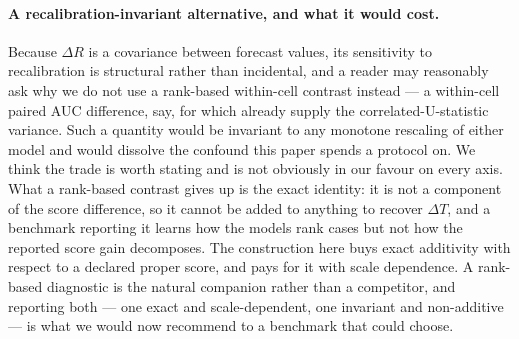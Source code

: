 \paragraph{A recalibration-invariant alternative, and what it would cost.}
Because $\Delta R$ is a covariance between forecast values, its sensitivity to
recalibration is structural rather than incidental, and a reader may reasonably ask why we
do not use a rank-based within-cell contrast instead --- a within-cell paired AUC
difference, say, for which \citet{delong1988comparing} already supply the
correlated-U-statistic variance. Such a quantity would be invariant to any monotone
rescaling of either model and would dissolve the confound this paper spends a protocol on.
We think the trade is worth stating and is not obviously in our favour on every axis.
What a rank-based contrast gives up is the exact identity: it is not a component of the
score difference, so it cannot be added to anything to recover $\Delta T$, and a benchmark
reporting it learns how the models rank cases but not how the reported score gain
decomposes. The construction here buys exact additivity with respect to a declared proper
score, and pays for it with scale dependence. A rank-based diagnostic is the natural
companion rather than a competitor, and reporting both --- one exact and scale-dependent,
one invariant and non-additive --- is what we would now recommend to a benchmark that
could choose.

